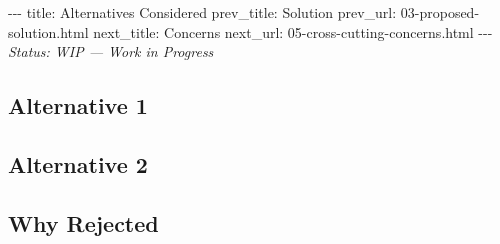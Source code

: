 \documentclass[12pt,a4paper]{article}
\begin{document}
-\/-\/- title: Alternatives Considered prev\_title: Solution prev\_url:
03-proposed-solution.html next\_title: Concerns next\_url:
05-cross-cutting-concerns.html -\/-\/- \emph{Status: WIP --- Work in
Progress}

\subsection{Alternative 1}\label{alternative-1}

\subsection{Alternative 2}\label{alternative-2}

\subsection{Why Rejected}\label{why-rejected}
\end{document}

